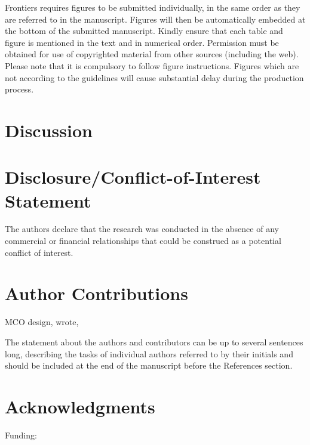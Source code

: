 \documentclass[utf8]{frontiersSCNS}
\begin{document}
Frontiers requires figures to be submitted individually, in the same
order as they are referred to in the manuscript. Figures will then be
automatically embedded at the bottom of the submitted manuscript. Kindly
ensure that each table and figure is mentioned in the text and in
numerical order. Permission must be obtained for use of copyrighted
material from other sources (including the web). Please note that it is
compulsory to follow figure instructions. Figures which are not
according to the guidelines will cause substantial delay during the
production process.

\hypertarget{discussion}{%
\section{Discussion}\label{discussion}}

\hypertarget{disclosureconflict-of-interest-statement}{%
\section*{Disclosure/Conflict-of-Interest
Statement}\label{disclosureconflict-of-interest-statement}}

The authors declare that the research was conducted in the absence of
any commercial or financial relationships that could be construed as a
potential conflict of interest.

\hypertarget{author-contributions}{%
\section*{Author Contributions}\label{author-contributions}}

MCO design, wrote,

The statement about the authors and contributors can be up to several
sentences long, describing the tasks of individual authors referred to
by their initials and should be included at the end of the manuscript
before the References section.

\hypertarget{acknowledgments}{%
\section*{Acknowledgments}\label{acknowledgments}}

Funding:
\end{document}
